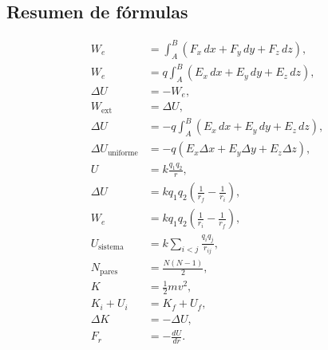 \subsection{Resumen de fórmulas}

\begin{align*}
W_e
&=
\int_A^B
\left(
F_x\,dx+F_y\,dy+F_z\,dz
\right),\\
W_e
&=
q\int_A^B
\left(
E_x\,dx+E_y\,dy+E_z\,dz
\right),\\
\Delta U
&=-W_e,\\
W_{\text{ext}}
&=\Delta U,\\
\Delta U
&=
-q\int_A^B
\left(
E_x\,dx+E_y\,dy+E_z\,dz
\right),\\
\Delta U_{\text{uniforme}}
&=
-q(E_x\Delta x+E_y\Delta y+E_z\Delta z),\\
U
&=
k\frac{q_1q_2}{r},\\
\Delta U
&=
kq_1q_2
\left(
\frac{1}{r_f}-\frac{1}{r_i}
\right),\\
W_e
&=
kq_1q_2
\left(
\frac{1}{r_i}-\frac{1}{r_f}
\right),\\
U_{\text{sistema}}
&=
k\sum_{i<j}\frac{q_iq_j}{r_{ij}},\\
N_{\text{pares}}
&=
\frac{N(N-1)}{2},\\
K
&=
\frac12mv^2,\\
K_i+U_i
&=
K_f+U_f,\\
\Delta K
&=-\Delta U,\\
F_r
&=
-\frac{dU}{dr}.
\end{align*}